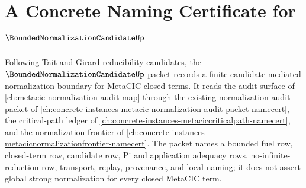 \chapter{A Concrete Naming Certificate for $\BoundedNormalizationCandidateUp$}
\label{ch:concrete-instances-bounded-normalization-candidate-namecert}

Following Tait and Girard reducibility candidates, the $\BoundedNormalizationCandidateUp$ packet records a finite candidate-mediated normalization boundary for MetaCIC closed terms. It reads the audit surface of \autoref{ch:metacic-normalization-audit-map} through the existing normalization audit packet of \autoref{ch:concrete-instances-metacic-normalization-audit-packet-namecert}, the critical-path ledger of \autoref{ch:concrete-instances-metaciccriticalpath-namecert}, and the normalization frontier of \autoref{ch:concrete-instances-metacicnormalizationfrontier-namecert}. The packet names a bounded fuel row, closed-term row, candidate row, Pi and application adequacy rows, no-infinite-reduction row, transport, replay, provenance, and local naming; it does not assert global strong normalization for every closed MetaCIC term.

